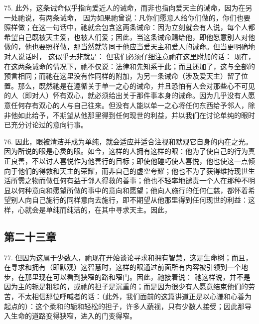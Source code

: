 75. 此外，这条诫命似乎指向爱近人的诫命，而非也指向爱天主的诫命，因为在另一处祂说，有两条诫命， 因为如果祂曾说：凡你们愿意人给你们做的，你们也要照样做；在这一句话中，祂就会包含这两条诫命：因为立刻就会有人说，每个人都希望自己既被天主爱，也被人们爱；因此，当这条诫命赐给他，即他愿意别人对他做的，他也要照样做，那当然就等同于他应当爱天主和爱人的诫命。但当更明确地对人说话时， 这似乎无非就是： 但我们必须仔细注意祂在这里附加的话： 现在，在这两条诫命的情况下，祂不仅说：法律和先知系于此；而且还加了，这与全部的预言相同；而祂在这里没有作同样的附加，为另一条诫命（涉及爱天主）留了位置。那么，既然祂是在遵循关于单一之心的诫命，并且恐怕有人会对那些心不可见的人（即对人）怀有双心，就必须给出关于那件事本身的诫命。因为几乎没有人愿意任何存有双心的人与自己往来。但没有人能以单一之心将任何东西给予邻人，除非他如此给予，不期望从他那里得到任何现世的利益，并以我们在讨论单纯的眼时已充分讨论过的意向行事。\par

76. 因此，眼被清洁并成为单纯，就会适应并适合注视和默观它自身的内在之光。因为所说的眼是心灵的眼。如今，这样的人拥有这样的眼：他为了使自己的行为真正良善，不以讨人喜悦作为他善行的目标；即使他碰巧使人喜悦，他也使这一点倾向于他们的得救和天主的荣耀，而非自己的虚空夸耀；他也不为了获得维持现世生活所需之物而做任何有益于邻人得救的善事；他也不轻率地谴责一个人在那种不明显以何种意向和愿望所做的事中的意向和愿望；他向人施行的任何仁慈，都怀着希望别人向自己施行的同样意向去施行，即不期望从他那里得到任何现世的利益：这样，心就会是单纯而纯洁的，在其中寻求天主。因此，\par


\subsection{第二十三章}

77. 但因为这属于少数人，祂现在开始谈论寻求和拥有智慧，这是生命树；而且，在寻求和拥有（即默观）这智慧时，这样的眼通过前面所有内容被引领到一个地步，在那里现在可以看到狭窄的路和窄门。因此，祂接着说： 祂这样说，并不是因为主的轭是粗糙的，或祂的担子是沉重的；而是因为很少有人愿意结束他们的劳苦，不太相信那位呼喊者的话：（此外，我们面前的这篇讲道正是以心谦和心善为起点的）：这个柔和的轭和轻松的担子，许多人藐视，只有少数人接受；因此那导入生命的道路变得狭窄，进入的门变得窄。\par

